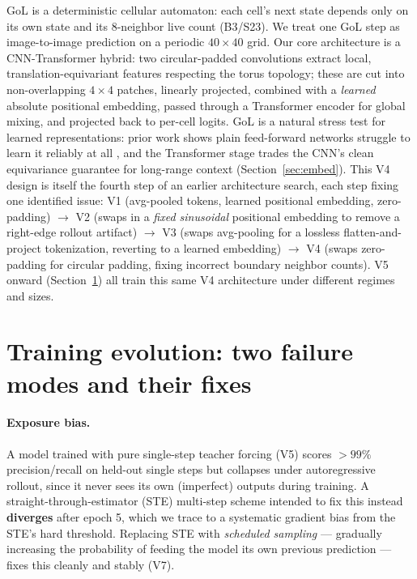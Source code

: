 \documentclass{article}
\begin{document}
GoL is a deterministic cellular automaton: each cell's next state depends
only on its own state and its 8-neighbor live count (B3/S23). We treat one
GoL step as image-to-image prediction on a periodic $40\times40$ grid. Our
core architecture is a CNN-Transformer hybrid: two circular-padded
convolutions extract local, translation-equivariant features respecting
the torus topology; these are cut into non-overlapping $4\times4$ patches,
linearly projected, combined with a \emph{learned} absolute positional
embedding, passed through a Transformer encoder for global mixing, and
projected back to per-cell logits. GoL is a natural stress test for
learned representations: prior work shows plain feed-forward networks
struggle to learn it reliably at all \citep{springer2021minimal}, and the
Transformer stage \citep{vaswani2017attention} trades the CNN's clean
equivariance guarantee for long-range context (Section~\ref{sec:embed}).
This V4 design is itself the fourth step of an earlier architecture
search, each step fixing one identified issue: V1 (avg-pooled tokens,
learned positional embedding, zero-padding) $\to$ V2 (swaps in a
\emph{fixed sinusoidal} positional embedding to remove a right-edge
rollout artifact) $\to$ V3 (swaps avg-pooling for a lossless
flatten-and-project tokenization, reverting to a learned embedding)
$\to$ V4 (swaps zero-padding for circular padding, fixing incorrect
boundary neighbor counts). V5 onward (Section~\ref{sec:evolution}) all
train this same V4 architecture under different regimes and sizes.

\section{Training evolution: two failure modes and their fixes}
\label{sec:evolution}

\paragraph{Exposure bias.} A model trained with pure single-step teacher
forcing (V5) scores $>99\%$ precision/recall on held-out single steps but
collapses under autoregressive rollout, since it never sees its own
(imperfect) outputs during training. A straight-through-estimator (STE)
multi-step scheme intended to fix this instead \textbf{diverges} after
epoch 5, which we trace to a systematic gradient bias from the STE's hard
threshold. Replacing STE with \emph{scheduled sampling}
\citep{bengio2015scheduled} --- gradually increasing the probability of
feeding the model its own previous prediction --- fixes this cleanly and
stably (V7).
\end{document}
